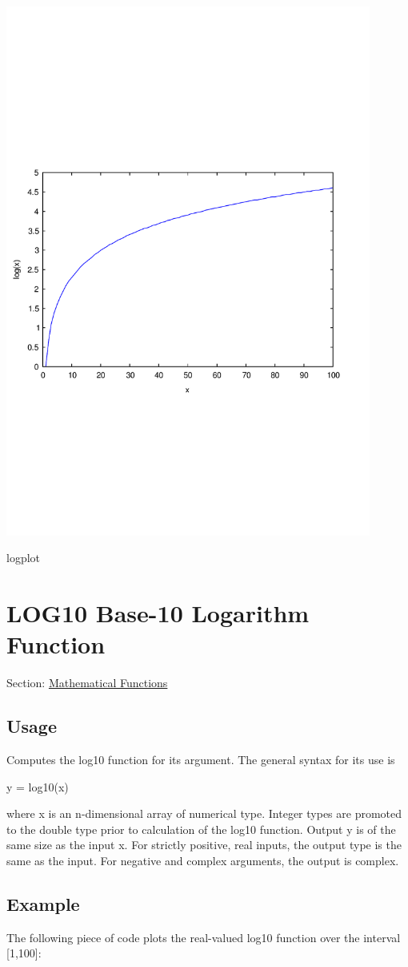  
\begin{DoxyImage}
\includegraphics[width=12cm]{logplot}
\caption{logplot}
\end{DoxyImage}
 \hypertarget{mathfunctions_log10}{}\section{L\-O\-G10 Base-\/10 Logarithm Function}\label{mathfunctions_log10}
Section\-: \hyperlink{sec_mathfunctions}{Mathematical Functions} \hypertarget{vtkwidgets_vtkxyplotwidget_Usage}{}\subsection{Usage}\label{vtkwidgets_vtkxyplotwidget_Usage}
Computes the {\ttfamily log10} function for its argument. The general syntax for its use is \begin{DoxyVerb}  y = log10(x)
\end{DoxyVerb}
 where {\ttfamily x} is an {\ttfamily n}-\/dimensional array of numerical type. Integer types are promoted to the {\ttfamily double} type prior to calculation of the {\ttfamily log10} function. Output {\ttfamily y} is of the same size as the input {\ttfamily x}. For strictly positive, real inputs, the output type is the same as the input. For negative and complex arguments, the output is complex. \hypertarget{variables_struct_Example}{}\subsection{Example}\label{variables_struct_Example}
The following piece of code plots the real-\/valued {\ttfamily log10} function over the interval {\ttfamily \mbox{[}1,100\mbox{]}}\-:


